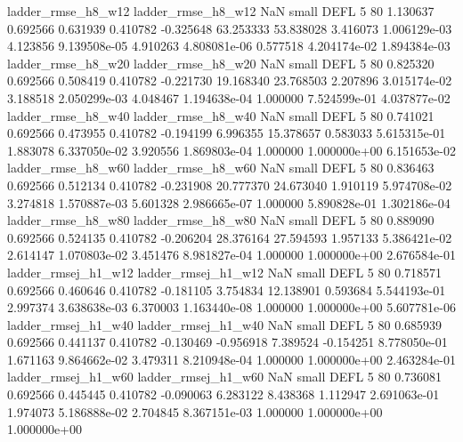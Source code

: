       ladder_rmse_h8_w12       ladder_rmse_h8_w12                   NaN      small     DEFL                 5 80 1.130637       0.692566 0.631939       0.410782   -0.325648     63.253333     53.838028     3.416073   1.006129e-03  4.123856 9.139508e-05     4.910263   4.808081e-06            0.577518    4.204174e-02        1.894384e-03
      ladder_rmse_h8_w20       ladder_rmse_h8_w20                   NaN      small     DEFL                 5 80 0.825320       0.692566 0.508419       0.410782   -0.221730     19.168340     23.768503     2.207896   3.015174e-02  3.188518 2.050299e-03     4.048467   1.194638e-04            1.000000    7.524599e-01        4.037877e-02
      ladder_rmse_h8_w40       ladder_rmse_h8_w40                   NaN      small     DEFL                 5 80 0.741021       0.692566 0.473955       0.410782   -0.194199      6.996355     15.378657     0.583033   5.615315e-01  1.883078 6.337050e-02     3.920556   1.869803e-04            1.000000    1.000000e+00        6.151653e-02
      ladder_rmse_h8_w60       ladder_rmse_h8_w60                   NaN      small     DEFL                 5 80 0.836463       0.692566 0.512134       0.410782   -0.231908     20.777370     24.673040     1.910119   5.974708e-02  3.274818 1.570887e-03     5.601328   2.986665e-07            1.000000    5.890828e-01        1.302186e-04
      ladder_rmse_h8_w80       ladder_rmse_h8_w80                   NaN      small     DEFL                 5 80 0.889090       0.692566 0.524135       0.410782   -0.206204     28.376164     27.594593     1.957133   5.386421e-02  2.614147 1.070803e-02     3.451476   8.981827e-04            1.000000    1.000000e+00        2.676584e-01
     ladder_rmsej_h1_w12      ladder_rmsej_h1_w12                   NaN      small     DEFL                 5 80 0.718571       0.692566 0.460646       0.410782   -0.181105      3.754834     12.138901     0.593684   5.544193e-01  2.997374 3.638638e-03     6.370003   1.163440e-08            1.000000    1.000000e+00        5.607781e-06
     ladder_rmsej_h1_w40      ladder_rmsej_h1_w40                   NaN      small     DEFL                 5 80 0.685939       0.692566 0.441137       0.410782   -0.130469     -0.956918      7.389524    -0.154251   8.778050e-01  1.671163 9.864662e-02     3.479311   8.210948e-04            1.000000    1.000000e+00        2.463284e-01
     ladder_rmsej_h1_w60      ladder_rmsej_h1_w60                   NaN      small     DEFL                 5 80 0.736081       0.692566 0.445445       0.410782   -0.090063      6.283122      8.438368     1.112947   2.691063e-01  1.974073 5.186888e-02     2.704845   8.367151e-03            1.000000    1.000000e+00        1.000000e+00
